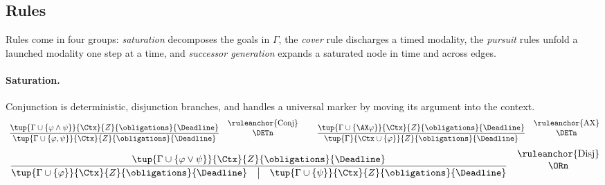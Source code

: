 \subsection{Rules}\label{ss:rules}



Rules come in four groups: \emph{saturation}
decomposes the goals in $\Gamma$, the \emph{cover} rule discharges a timed modality, the
\emph{pursuit} rules unfold a launched modality one step at a time, and \emph{successor
generation} expands a saturated node in time and across edges.

\paragraph{Saturation.}
Conjunction  is deterministic, disjunction  branches, and  handles a universal marker by moving its argument into the context. %
\vspace{-0.2cm}
\[
\ \frac{\tup{\Gamma\cup\{\varphi\land\psi\}}{\Ctx}{Z}{\obligations}{\Deadline}}
{\tup{\Gamma\cup\{\varphi,\psi\}}{\Ctx}{Z}{\obligations}{\Deadline}}\quad
\shortstack{\ruleanchor{Conj}\\\DETn}
\qquad
\ \frac{\tup{\Gamma\cup\{\AX\varphi\}}{\Ctx}{Z}{\obligations}{\Deadline}}
{\tup{\Gamma}{\Ctx\cup\{\varphi\}}{Z}{\obligations}{\Deadline}}\quad
\shortstack{\ruleanchor{AX}\\ \DETn}
\]\vspace{-0.35cm}
\[
\ \frac{\tup{\Gamma\cup\{\varphi\lor\psi\}}{\Ctx}{Z}{\obligations}{\Deadline}}
{\tup{\Gamma\cup\{\varphi\}}{\Ctx}{Z}{\obligations}{\Deadline}\quad\big|\quad
\tup{\Gamma\cup\{\psi\}}{\Ctx}{Z}{\obligations}{\Deadline}}
\quad
\shortstack{\ruleanchor{Disj}\\\ORn}
\]

